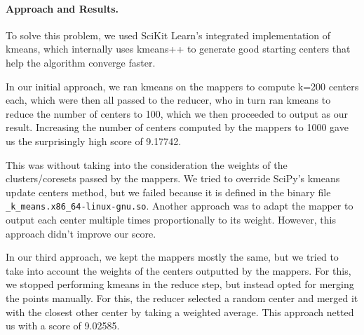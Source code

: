 \documentclass[a4paper, 11pt]{article}
\begin{document}

\paragraph{Approach and Results.\!\!\!}

To solve this problem, we used SciKit Learn's integrated implementation of kmeans, which internally uses kmeans++ to generate good starting centers that help the algorithm converge faster.

In our initial approach, we ran kmeans on the mappers to compute k=200 centers each, which were then all passed to the reducer, who in turn ran kmeans to reduce the number of centers to 100, which we then proceeded to output as our result. Increasing the number of centers computed by the mappers to 1000 gave us the surprisingly high score of 9.17742.

This was without taking into the consideration the weights of the clusters/coresets passed by the mappers. We tried to override SciPy's kmeans update centers method, but we failed because it is defined in the binary file \verb|_k_means.x86_64-linux-gnu.so|. Another approach was to adapt the mapper to output each center multiple times proportionally to its weight. However, this approach didn't improve our score.

In our third approach, we kept the mappers mostly the same, but we tried to take into account the weights of the centers outputted by the mappers. For this, we stopped performing kmeans in the reduce step, but instead opted for merging the points manually. For this, the reducer selected a random center and merged it with the closest other center by taking a weighted average.
This approach netted us with a score of 9.02585.




\end{document}
